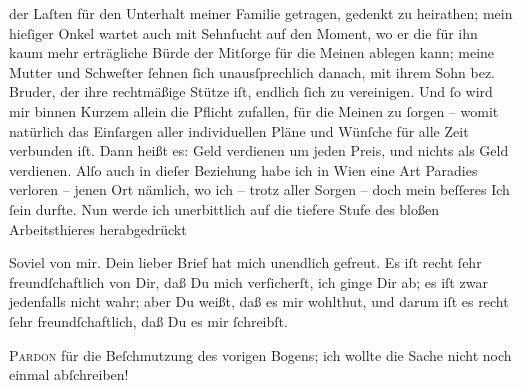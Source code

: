                der Laſten für den Unterhalt meiner Familie getragen, gedenkt zu heirathen; mein
               hieſiger Onkel
               wartet auch mit Sehnſucht auf den Moment, wo er die für ihn kaum mehr erträgliche
               Bürde der Mitſorge für die Meinen ablegen kann; meine Mutter und Schweſter ſehnen ſich unausſprechlich
               danach, mit ihrem Sohn bez. Bruder, der ihre rechtmäßige Stütze iſt, endlich ſich {\pb}zu vereinigen. Und ſo wird mir binnen Kurzem allein
               die Pflicht zufallen, für die Meinen zu ſorgen – womit natürlich das Einſargen aller
               individuellen Pläne und Wünſche für alle Zeit verbunden iſt. Dann heißt es: Geld
               verdienen um jeden Preis, und nichts als Geld verdienen. Alſo auch in dieſer
               Beziehung habe ich in Wien eine Art Paradies
               verloren – jenen Ort nämlich, wo
               ich – trotz aller Sorgen – doch mein beſſeres Ich ſein durfte. Nun werde ich
               unerbittlich auf die tiefere Stufe des bloßen Arbeitsthieres herabgedrückt{\dotsfive}\pend
           
\pstart
           Soviel von mir. Dein lieber Brief hat mich unendlich gefreut. Es iſt recht ſehr
               freundſchaftlich von Dir, daß Du mich verſicherſt, ich ginge Dir ab; es iſt zwar
               jedenfalls nicht wahr; aber Du weißt, daß es mir wohlthut, und darum iſt es recht
               ſehr freundſchaftlich, daß Du es mir ſchreibſt.\pend
           
\pstart
           {\pb}\textsc{Pardon} für die Beſchmutzung des vorigen Bogens; ich wollte
               die Sache nicht noch einmal abſchreiben!\pend
           
